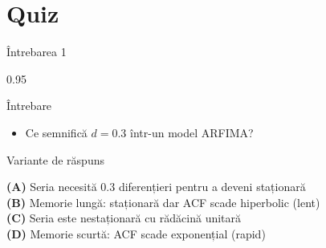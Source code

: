 \documentclass[9pt, aspectratio=169, t]{beamer}
\begin{document}
\section{Quiz}

\begin{frame}{Întrebarea 1}
    \begin{cminipage}{0.95\textwidth}
        \begin{alertblock}{Întrebare}
            \begin{itemize}\setlength{\itemsep}{0pt}
                \item Ce semnifică $d = 0.3$ într-un model ARFIMA?
            \end{itemize}
        \end{alertblock}

        \vspace{0.3cm}

        \begin{block}{Variante de răspuns}

            \textcolor{MainBlue}{\textbf{(A)}} Seria necesită 0.3 diferențieri pentru a deveni staționară\\[3pt]

            \textcolor{MainBlue}{\textbf{(B)}} Memorie lungă: staționară dar ACF scade hiperbolic (lent)\\[3pt]

            \textcolor{MainBlue}{\textbf{(C)}} Seria este nestaționară cu rădăcină unitară\\[3pt]

            \textcolor{MainBlue}{\textbf{(D)}} Memorie scurtă: ACF scade exponențial (rapid)

        \end{block}
    \end{cminipage}
\end{frame}
\end{document}
